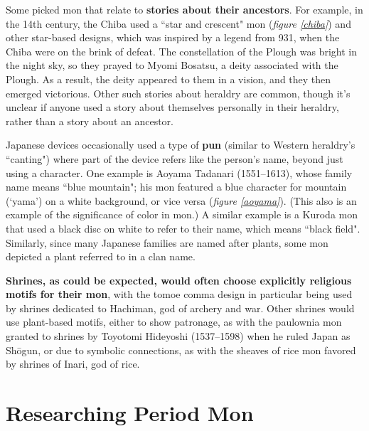 \documentclass{article}
\newcounter{fig}
\begin{document}
  Some picked mon that relate to \textbf{stories about their ancestors}.
  For example, in the 14th century, the Chiba used a ``star and
  crescent" mon (\emph{figure \ref{chiba}}) and other star-based designs,
  which was inspired by a legend from 931, when the Chiba were on the
  brink of defeat.  The constellation of the Plough was bright in the
  night sky, so they prayed to Myomi Bosatsu, a deity associated with
  the Plough.  As a result, the deity appeared to them in a vision,
  and they then emerged victorious. Other such
  stories about heraldry are common, though it's unclear if anyone
  used a story about themselves personally in their heraldry, rather
  than a story about an ancestor.

  Japanese devices occasionally used a type of \textbf{pun} (similar to
  Western heraldry's ``canting") where part of the device refers like
  the person's name, beyond just using a character.  One example is Aoyama
  Tadanari (1551--1613), whose family name means ``blue mountain"; his
  mon featured a blue character for mountain (`yama') on a white
  background, or vice versa (\emph{figure
  \ref{aoyama}}). (This
  also is an example of the significance of color in mon.)  A
  similar example is a Kuroda mon that used a black disc on white to
  refer to their name, which means ``black field".
   Similarly, since many Japanese families are named after
  plants, some mon depicted a plant referred to in a clan
  name.

  \textbf{Shrines, as could be expected, would often choose explicitly
  religious motifs for their mon}, with the tomoe comma design in
  particular being used by shrines dedicated to Hachiman, god of
  archery and war.  Other shrines would use plant-based motifs, either
  to show patronage, as with the paulownia mon granted to shrines by
  Toyotomi Hideyoshi (1537--1598) when he ruled Japan as Sh\=ogun, or
  due to symbolic connections, as with the sheaves of rice mon favored
  by shrines of Inari, god of rice.

\section{Researching Period Mon}
\end{document}

